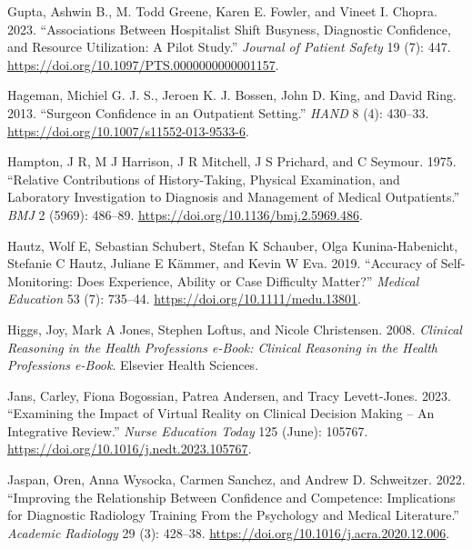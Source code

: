 \documentclass[a4paper, nobind]{templates/ociamthesis}
\newlength{\cslhangindent}
\newenvironment{CSLReferences}[2] %
 {%
  \setlength{\parindent}{0pt}
  \ifodd #1
  \let\oldpar\par
  \def\par{\hangindent=\cslhangindent\oldpar}
  \fi
  \setlength{\parskip}{1mm}
  \setlength{\baselineskip}{6mm}
 }%
 {}
\begin{document}
\begin{CSLReferences}{1}{0}
Gupta, Ashwin B., M. Todd Greene, Karen E. Fowler, and Vineet I. Chopra. 2023. {``Associations {Between} {Hospitalist} {Shift} {Busyness}, {Diagnostic} {Confidence}, and {Resource} {Utilization}: {A} {Pilot} {Study}.''} \emph{Journal of Patient Safety} 19 (7): 447. \url{https://doi.org/10.1097/PTS.0000000000001157}.

Hageman, Michiel G. J. S., Jeroen K. J. Bossen, John D. King, and David Ring. 2013. {``Surgeon {Confidence} in an {Outpatient} {Setting}.''} \emph{HAND} 8 (4): 430--33. \url{https://doi.org/10.1007/s11552-013-9533-6}.

Hampton, J R, M J Harrison, J R Mitchell, J S Prichard, and C Seymour. 1975. {``Relative Contributions of History-Taking, Physical Examination, and Laboratory Investigation to Diagnosis and Management of Medical Outpatients.''} \emph{BMJ} 2 (5969): 486--89. \url{https://doi.org/10.1136/bmj.2.5969.486}.

Hautz, Wolf E, Sebastian Schubert, Stefan K Schauber, Olga Kunina-Habenicht, Stefanie C Hautz, Juliane E Kämmer, and Kevin W Eva. 2019. {``Accuracy of Self-Monitoring: Does Experience, Ability or Case Difficulty Matter?''} \emph{Medical Education} 53 (7): 735--44. \url{https://doi.org/10.1111/medu.13801}.

Higgs, Joy, Mark A Jones, Stephen Loftus, and Nicole Christensen. 2008. \emph{Clinical Reasoning in the Health Professions e-Book: Clinical Reasoning in the Health Professions e-Book}. Elsevier Health Sciences.

Jans, Carley, Fiona Bogossian, Patrea Andersen, and Tracy Levett-Jones. 2023. {``Examining the Impact of Virtual Reality on Clinical Decision Making -- {An} Integrative Review.''} \emph{Nurse Education Today} 125 (June): 105767. \url{https://doi.org/10.1016/j.nedt.2023.105767}.

Jaspan, Oren, Anna Wysocka, Carmen Sanchez, and Andrew D. Schweitzer. 2022. {``Improving the {Relationship} {Between} {Confidence} and {Competence}: {Implications} for {Diagnostic} {Radiology} {Training} {From} the {Psychology} and {Medical} {Literature}.''} \emph{Academic Radiology} 29 (3): 428--38. \url{https://doi.org/10.1016/j.acra.2020.12.006}.


\end{CSLReferences}
\end{document}
